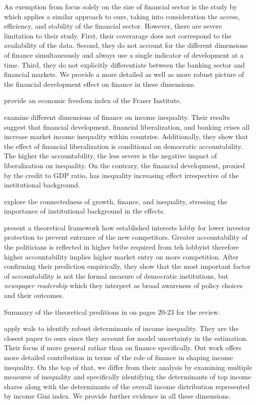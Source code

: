 \documentclass[a4paper,11pt]{article}
\begin{document}
An exemption from focus solely on the size of financial sector is the study by \citet{naceurzhang2016} which applies a similar approach to ours, taking into consideration the access, efficiency, and stability of the financial sector. However, there are severe limitation to their study. First, their coverarage does not correspond to the availability of the data. Second, they do not account for the different dimensions of finance simultaneously and always use a single indicator of development at a time. Third, they do not explicitly differentiate between the banking sector and financial markets. We provide a more detailed as well as more robust picture of the financial development effect on finance in these dimensions.

\citet{gwartney2017} provide an economic freedom index of the Fraser Institute.

\citet{de2017finance} examine different dimensions of finance on income inequality. Their results suggest that financial development, financial liberalization, and banking crises all increase market income inequality within countries. Additionally, they show that the effect of financial liberalization is conditional on democratic accountability. The higher the accountability, the less severe is the negative impact of liberalization on inequality. On the contrary, the financial development, proxied by the credit to GDP ratio, has inequality increasing effect irrespective of the institutional background.

\citet{claessens2007finance} explore the connectedness of growth, finance, and inequality, stressing the importance of institutional background in the effects.  

\citet{perotti2007investor} present a theoretical framework how established interests lobby for lower investor protection to prevent entrance of the new competitors. Greater accountability of the politicians is reflected in higher bribe required from teh lobbyist therefore higher accountability implies higher market entry on more competition. After confirming their prediction empirically, they show that the most important factor of accountability is not the formal measure of democratic institutions, but \emph{newspaper readership} which they interpret as broad awareness of policy choices and their outcomes.

Summary of the theoretical preditions in \citet{demirgucc2009finance} on pages 20-23 for the review.

\citet{furceri2019robust} apply \ac{wals} to identify robust determinants of income inequality. They are the closest paper to ours since they account for model uncertainty in the estimation. Their focus if more general rathar than on finance specifically. Out work offers more detailed contribution in terms of the role of finance in shaping income inequality. On the top of that, we differ from their analysis by examining multiple measures of inequality and specifically identifying the determinants of top income shares along with the determinants of the overall income distribution represented by income Gini index. We provide further evidence in all these dimensions.
\end{document}
